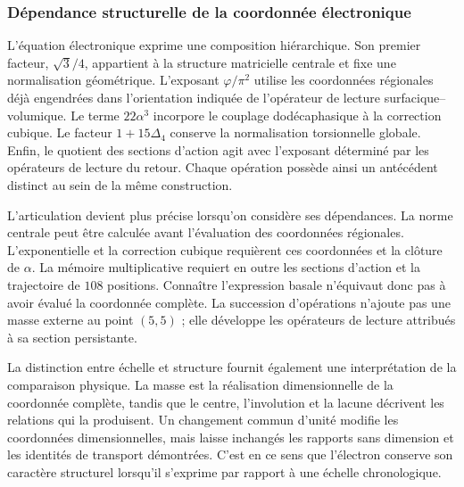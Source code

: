 \subsubsection{Dépendance structurelle de la coordonnée électronique}

L'équation électronique exprime une composition hiérarchique. Son premier
facteur, \(\sqrt3/4\), appartient à la structure matricielle centrale et fixe
une normalisation géométrique. L'exposant \(\varphi/\pi^2\) utilise les
coordonnées régionales déjà engendrées dans l'orientation indiquée de l'opérateur
de lecture surfacique--volumique. Le terme \(22\alpha^3\) incorpore le couplage
dodécaphasique à la correction cubique. Le facteur \(1+15\Delta_4\) conserve
la normalisation torsionnelle globale. Enfin, le quotient des sections
d'action agit avec l'exposant déterminé par les opérateurs de lecture du retour.
Chaque opération possède ainsi un antécédent distinct au sein de la même
construction.

L'articulation devient plus précise lorsqu'on considère ses dépendances.
La norme centrale peut être calculée avant l'évaluation des coordonnées
régionales. L'exponentielle et la correction cubique requièrent ces
coordonnées et la clôture de \(\alpha\). La mémoire multiplicative requiert
en outre les sections d'action et la trajectoire de \(108\) positions.
Connaître l'expression basale n'équivaut donc pas à avoir évalué la
coordonnée complète. La succession d'opérations n'ajoute pas une masse
externe au point \((5,5)\) ; elle développe les opérateurs de lecture attribués à sa
section persistante.

La distinction entre échelle et structure fournit également une
interprétation de la comparaison physique. La masse est la réalisation
dimensionnelle de la coordonnée complète, tandis que le centre, l'involution
et la lacune décrivent les relations qui la produisent. Un changement commun
d'unité modifie les coordonnées dimensionnelles, mais laisse inchangés
les rapports sans dimension et les identités de transport démontrées.
C'est en ce sens que l'électron conserve son caractère structurel
lorsqu'il s'exprime par rapport à une échelle chronologique.
